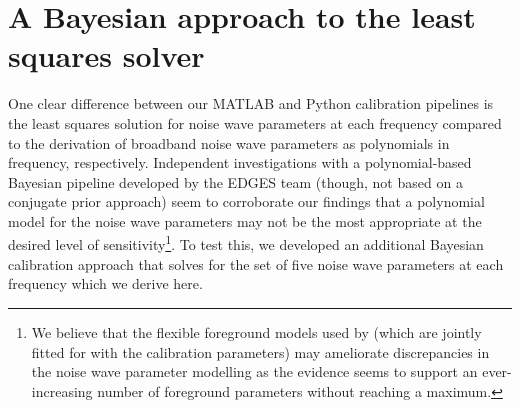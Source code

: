 \section{A Bayesian approach to the least squares solver}
\label{sec:fbf}

One clear difference between our MATLAB and Python calibration pipelines is the least squares solution for noise wave parameters at each frequency compared to the derivation of broadband noise wave parameters as polynomials in frequency, respectively. Independent investigations with a polynomial-based Bayesian pipeline developed by the EDGES team (though, not based on a conjugate prior approach) seem to corroborate our findings that a polynomial model for the noise wave parameters may not be the most appropriate at the desired level of sensitivity\footnote{We believe that the flexible foreground models used by \citet{murray_calpap} (which are jointly fitted for with the calibration parameters) may ameliorate discrepancies in the noise wave parameter modelling as the evidence seems to support an ever-increasing number of foreground parameters without reaching a maximum.}. To test this, we developed an additional Bayesian calibration approach that solves for the set of five noise wave parameters at each frequency which we derive here.

